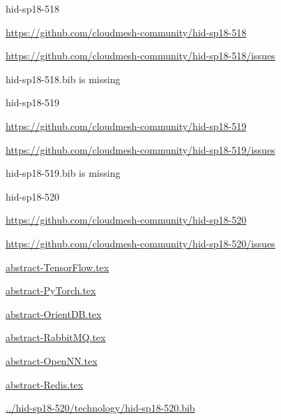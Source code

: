 \begin{IU}

hid-sp18-518

\url{https://github.com/cloudmesh-community/hid-sp18-518}

\url{https://github.com/cloudmesh-community/hid-sp18-518/issues}

hid-sp18-518.bib is missing

\end{IU}


\begin{IU}

hid-sp18-519

\url{https://github.com/cloudmesh-community/hid-sp18-519}

\url{https://github.com/cloudmesh-community/hid-sp18-519/issues}

hid-sp18-519.bib is missing

\end{IU}


\begin{IU}

hid-sp18-520

\url{https://github.com/cloudmesh-community/hid-sp18-520}

\url{https://github.com/cloudmesh-community/hid-sp18-520/issues}

\href{https://github.com/cloudmesh-community/hid-sp18-520/blob/master//technology/abstract-TensorFlow.tex}{abstract-TensorFlow.tex}

\href{https://github.com/cloudmesh-community/hid-sp18-520/blob/master//technology/abstract-PyTorch.tex}{abstract-PyTorch.tex}

\href{https://github.com/cloudmesh-community/hid-sp18-520/blob/master//technology/abstract-OrientDB.tex}{abstract-OrientDB.tex}

\href{https://github.com/cloudmesh-community/hid-sp18-520/blob/master//technology/abstract-RabbitMQ.tex}{abstract-RabbitMQ.tex}

\href{https://github.com/cloudmesh-community/hid-sp18-520/blob/master//technology/abstract-OpenNN.tex}{abstract-OpenNN.tex}

\href{https://github.com/cloudmesh-community/hid-sp18-520/blob/master//technology/abstract-Redis.tex}{abstract-Redis.tex}

\href{https://github.com/cloudmesh-community/hid-sp18-520/blob/master//technology/hid-sp18-520.bib}{../hid-sp18-520/technology/hid-sp18-520.bib}

\end{IU}


